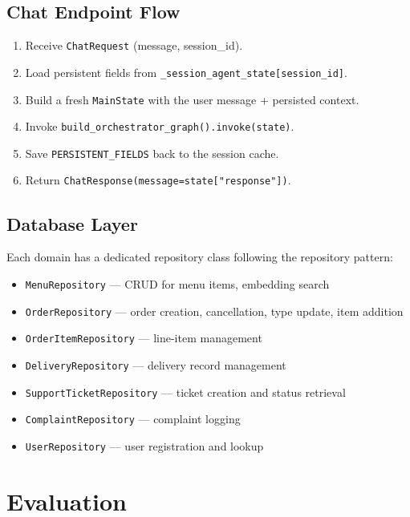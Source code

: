 \documentclass[12pt,a4paper]{report}
\begin{document}
\section{Chat Endpoint Flow}

\begin{enumerate}
    \item Receive \texttt{ChatRequest} (message, session\_id).
    \item Load persistent fields from \texttt{\_session\_agent\_state[session\_id]}.
    \item Build a fresh \texttt{MainState} with the user message + persisted context.
    \item Invoke \texttt{build\_orchestrator\_graph().invoke(state)}.
    \item Save \texttt{PERSISTENT\_FIELDS} back to the session cache.
    \item Return \texttt{ChatResponse(message=state["response"])}.
\end{enumerate}

\section{Database Layer}

Each domain has a dedicated repository class following the repository pattern:

\begin{itemize}
    \item \texttt{MenuRepository} — CRUD for menu items, embedding search
    \item \texttt{OrderRepository} — order creation, cancellation, type update, item addition
    \item \texttt{OrderItemRepository} — line-item management
    \item \texttt{DeliveryRepository} — delivery record management
    \item \texttt{SupportTicketRepository} — ticket creation and status retrieval
    \item \texttt{ComplaintRepository} — complaint logging
    \item \texttt{UserRepository} — user registration and lookup
\end{itemize}

\chapter{Evaluation}\label{ch:eval}
\end{document}
